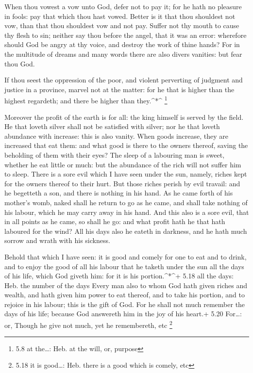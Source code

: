  When thou vowest a vow unto God, defer not to pay it; for
he hath no pleasure in fools: pay that which thou hast vowed.
 Better is it that thou shouldest not vow, than that thou
shouldest vow and not pay.  Suffer not thy mouth to cause
thy flesh to sin; neither say thou before the angel, that it was an
error: wherefore should God be angry at thy voice, and destroy the work
of thine hands?  For in the multitude of dreams and many
words there are also divers vanities: but fear thou God.

 If thou seest the oppression of the poor, and violent
perverting of judgment and justice in a province, marvel not at the
matter: for he that is higher than the highest regardeth; and there be
higher than they.\^{}*\^{} \footnote{5.8 at the\ldots: Heb. at the will,
  or, purpose}

 Moreover the profit of the earth is for all: the king
himself is served by the field.  He that loveth silver
shall not be satisfied with silver; nor he that loveth abundance with
increase: this is also vanity.  When goods increase, they
are increased that eat them: and what good is there to the owners
thereof, saving the beholding of them with their eyes?  The
sleep of a labouring man is sweet, whether he eat little or much: but
the abundance of the rich will not suffer him to sleep. 
There is a sore evil which I have seen under the sun, namely, riches
kept for the owners thereof to their hurt.  But those
riches perish by evil travail: and he begetteth a son, and there is
nothing in his hand.  As he came forth of his mother's
womb, naked shall he return to go as he came, and shall take nothing of
his labour, which he may carry away in his hand.  And this
also is a sore evil, that in all points as he came, so shall he go: and
what profit hath he that hath laboured for the wind?  All
his days also he eateth in darkness, and he hath much sorrow and wrath
with his sickness.

 Behold that which I have seen: it is good and comely for
one to eat and to drink, and to enjoy the good of all his labour that he
taketh under the sun all the days of his life, which God giveth him: for
it is his portion.\^{}*\^{}+ 5.18 all the days: Heb. the number of the
days  Every man also to whom God hath given riches and
wealth, and hath given him power to eat thereof, and to take his
portion, and to rejoice in his labour; this is the gift of God.
 For he shall not much remember the days of his life;
because God answereth him in the joy of his heart.+ 5.20 For\ldots: or,
Though he give not much, yet he remembereth, etc \footnote{5.18 it is
  good\ldots: Heb. there is a good which is comely, etc}

